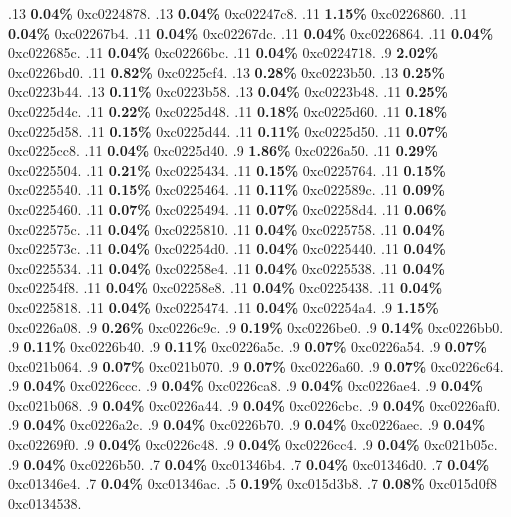 \begin{profile}
{.13 \textbf{0.04\%} 0xc0224878. 
.13 \textbf{0.04\%} 0xc02247c8. 
.11 \textbf{1.15\%} 0xc0226860. 
.11 \textbf{0.04\%} 0xc02267b4. 
.11 \textbf{0.04\%} 0xc02267dc. 
.11 \textbf{0.04\%} 0xc0226864. 
.11 \textbf{0.04\%} 0xc022685c. 
.11 \textbf{0.04\%} 0xc02266bc. 
.11 \textbf{0.04\%} 0xc0224718. 
.9 \textbf{2.02\%} 0xc0226bd0. 
.11 \textbf{0.82\%} 0xc0225cf4. 
.13 \textbf{0.28\%} 0xc0223b50. 
.13 \textbf{0.25\%} 0xc0223b44. 
.13 \textbf{0.11\%} 0xc0223b58. 
.13 \textbf{0.04\%} 0xc0223b48. 
.11 \textbf{0.25\%} 0xc0225d4c. 
.11 \textbf{0.22\%} 0xc0225d48. 
.11 \textbf{0.18\%} 0xc0225d60. 
.11 \textbf{0.18\%} 0xc0225d58. 
.11 \textbf{0.15\%} 0xc0225d44. 
.11 \textbf{0.11\%} 0xc0225d50. 
.11 \textbf{0.07\%} 0xc0225cc8. 
.11 \textbf{0.04\%} 0xc0225d40. 
.9 \textbf{1.86\%} 0xc0226a50. 
.11 \textbf{0.29\%} 0xc0225504. 
.11 \textbf{0.21\%} 0xc0225434. 
.11 \textbf{0.15\%} 0xc0225764. 
.11 \textbf{0.15\%} 0xc0225540. 
.11 \textbf{0.15\%} 0xc0225464. 
.11 \textbf{0.11\%} 0xc022589c. 
.11 \textbf{0.09\%} 0xc0225460. 
.11 \textbf{0.07\%} 0xc0225494. 
.11 \textbf{0.07\%} 0xc02258d4. 
.11 \textbf{0.06\%} 0xc022575c. 
.11 \textbf{0.04\%} 0xc0225810. 
.11 \textbf{0.04\%} 0xc0225758. 
.11 \textbf{0.04\%} 0xc022573c. 
.11 \textbf{0.04\%} 0xc02254d0. 
.11 \textbf{0.04\%} 0xc0225440. 
.11 \textbf{0.04\%} 0xc0225534. 
.11 \textbf{0.04\%} 0xc02258e4. 
.11 \textbf{0.04\%} 0xc0225538. 
.11 \textbf{0.04\%} 0xc02254f8. 
.11 \textbf{0.04\%} 0xc02258e8. 
.11 \textbf{0.04\%} 0xc0225438. 
.11 \textbf{0.04\%} 0xc0225818. 
.11 \textbf{0.04\%} 0xc0225474. 
.11 \textbf{0.04\%} 0xc02254a4. 
.9 \textbf{1.15\%} 0xc0226a08. 
.9 \textbf{0.26\%} 0xc0226c9c. 
.9 \textbf{0.19\%} 0xc0226be0. 
.9 \textbf{0.14\%} 0xc0226bb0. 
.9 \textbf{0.11\%} 0xc0226b40. 
.9 \textbf{0.11\%} 0xc0226a5c. 
.9 \textbf{0.07\%} 0xc0226a54. 
.9 \textbf{0.07\%} 0xc021b064. 
.9 \textbf{0.07\%} 0xc021b070. 
.9 \textbf{0.07\%} 0xc0226a60. 
.9 \textbf{0.07\%} 0xc0226c64. 
.9 \textbf{0.04\%} 0xc0226ccc. 
.9 \textbf{0.04\%} 0xc0226ca8. 
.9 \textbf{0.04\%} 0xc0226ae4. 
.9 \textbf{0.04\%} 0xc021b068. 
.9 \textbf{0.04\%} 0xc0226a44. 
.9 \textbf{0.04\%} 0xc0226cbc. 
.9 \textbf{0.04\%} 0xc0226af0. 
.9 \textbf{0.04\%} 0xc0226a2c. 
.9 \textbf{0.04\%} 0xc0226b70. 
.9 \textbf{0.04\%} 0xc0226aec. 
.9 \textbf{0.04\%} 0xc02269f0. 
.9 \textbf{0.04\%} 0xc0226c48. 
.9 \textbf{0.04\%} 0xc0226cc4. 
.9 \textbf{0.04\%} 0xc021b05c. 
.9 \textbf{0.04\%} 0xc0226b50. 
.7 \textbf{0.04\%} 0xc01346b4. 
.7 \textbf{0.04\%} 0xc01346d0. 
.7 \textbf{0.04\%} 0xc01346e4. 
.7 \textbf{0.04\%} 0xc01346ac. 
.5 \textbf{0.19\%} 0xc015d3b8. 
.7 \textbf{0.08\%} 0xc015d0f8\newline {} 0xc0134538. 
}
\end{profile}
